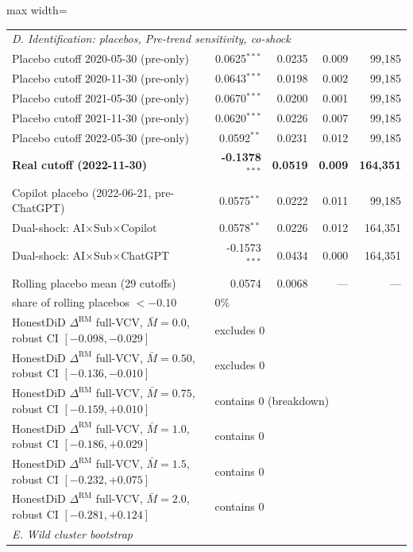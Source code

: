 \begin{table}[!htbp]
\begin{adjustbox}{max width=\textwidth}
\begin{tabular}{lrrrr}
\midrule
\multicolumn{5}{l}{\textit{D. Identification: placebos, Pre-trend sensitivity, co-shock}} \\
  Placebo cutoff 2020-05-30 (pre-only) & 0.0625$^{***}$ & 0.0235 & 0.009 & 99,185 \\
  Placebo cutoff 2020-11-30 (pre-only) & 0.0643$^{***}$ & 0.0198 & 0.002 & 99,185 \\
  Placebo cutoff 2021-05-30 (pre-only) & 0.0670$^{***}$ & 0.0200 & 0.001 & 99,185 \\
  Placebo cutoff 2021-11-30 (pre-only) & 0.0620$^{***}$ & 0.0226 & 0.007 & 99,185 \\
  Placebo cutoff 2022-05-30 (pre-only) & 0.0592$^{**}$ & 0.0231 & 0.012 & 99,185 \\
  \rowcolor{gray!15}
  \textbf{Real cutoff (2022-11-30)} & \textbf{-0.1378}$^{***}$ & \textbf{0.0519} & \textbf{0.009} & \textbf{164,351} \\
  Copilot placebo (2022-06-21, pre-ChatGPT) & 0.0575$^{**}$ & 0.0222 & 0.011 & 99,185 \\
  Dual-shock: AI$\times$Sub$\times$Copilot & 0.0578$^{**}$ & 0.0226 & 0.012 & 164,351 \\
  Dual-shock: AI$\times$Sub$\times$ChatGPT & -0.1573$^{***}$ & 0.0434 & 0.000 & 164,351 \\
  Rolling placebo mean (29 cutoffs) & 0.0574 & 0.0068 & --- & --- \\
  \quad share of rolling placebos $< -0.10$ & \multicolumn{4}{l}{0\%} \\
  HonestDiD $\Delta^{\text{RM}}$ full-VCV, $\bar M=0.0$, robust CI $[-0.098,-0.029]$ & \multicolumn{4}{l}{excludes 0} \\
  HonestDiD $\Delta^{\text{RM}}$ full-VCV, $\bar M=0.50$, robust CI $[-0.136,-0.010]$ & \multicolumn{4}{l}{excludes 0} \\
  HonestDiD $\Delta^{\text{RM}}$ full-VCV, $\bar M=0.75$, robust CI $[-0.159,+0.010]$ & \multicolumn{4}{l}{contains 0 (breakdown)} \\
  HonestDiD $\Delta^{\text{RM}}$ full-VCV, $\bar M=1.0$, robust CI $[-0.186,+0.029]$ & \multicolumn{4}{l}{contains 0} \\
  HonestDiD $\Delta^{\text{RM}}$ full-VCV, $\bar M=1.5$, robust CI $[-0.232,+0.075]$ & \multicolumn{4}{l}{contains 0} \\
  HonestDiD $\Delta^{\text{RM}}$ full-VCV, $\bar M=2.0$, robust CI $[-0.281,+0.124]$ & \multicolumn{4}{l}{contains 0} \\
\midrule
\multicolumn{5}{l}{\textit{E. Wild cluster bootstrap}} \\

\end{tabular}
\end{adjustbox}
\end{table}
